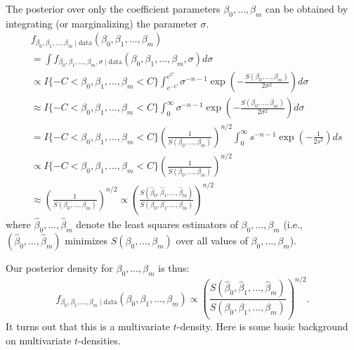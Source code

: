 \documentclass{scrartcl}
\begin{document}
The 
posterior over only the coefficient parameters $\beta_0, \dots, \beta_m$ can
be obtained by integrating (or marginalizing) the parameter $\sigma$. 
\begin{align*}
 & f_{\beta_0, \beta_1, \dots, \beta_m \mid \text{data}} (\beta_0, \beta_1, \dots,
   \beta_m) \\  &= \int 
                                                              f_{\beta_0, 
                                                              \beta_1,
                  \dots, \beta_m,
                                                              \sigma
                                                              \mid
                                                              \text{data}}(\beta_0,
                                                              \beta_1,
                  \dots, \beta_m,
                                                              \sigma)
                                                              d\sigma
  \\
  &\propto I\{-C < \beta_0, \beta_1, \dots, \beta_m < C\}
    \int_{e^{-C}}^{e^C} \sigma^{-n-1} \exp 
                                        \left(-\frac{S(\beta_0, \dots,
    \beta_m)}{2 \sigma^2} \right) d\sigma \\
&\approx 
    I\{-C < \beta_0, \beta_1, \dots, \beta_m < C\} \int_{0}^{\infty} \sigma^{-n-1}
    \exp 
                                        \left(-\frac{S(\beta_0,\dots, \beta_m)}{2 \sigma^2}                               
  \right)  d\sigma \\
&=    I\{-C < \beta_0, \beta_1, \dots, \beta_m < C\}
  \left(\frac{1}{S(\beta_0, \dots, \beta_m)}\right)^{n/2} \int_{0}^{\infty} s^{-n-1} \exp
  \left(-\frac{1}{2s^2} \right) ds \\
&\propto   I\{-C < \beta_0, \beta_1, \dots, \beta_m < C\}
  \left(\frac{1}{S(\beta_0, \dots, \beta_m)}\right)^{n/2} \\
 &\approx   \left(\frac{1}{S(\beta_0, \dots, \beta_m)}\right)^{n/2} \propto 
  \left(\frac{S(\hat{\beta}_0, \hat{\beta}_1, \dots,
      \hat{\beta}_m)}{S(\beta_0, \beta_1, \dots, \beta_m)} 
  \right)^{n/2}
\end{align*}
where $\hat{\beta}_0, \dots, \hat{\beta}_m$ denote the least squares
estimators of $\beta_0, \dots, \beta_m$ (i.e., $(\hat{\beta}_0, \dots,
\hat{\beta}_m)$ minimizes $S(\beta_0, \dots, \beta_m)$ over all values
of $\beta_0, \dots, \beta_m$). 

Our posterior density for $\beta_0, \dots, \beta_m$ is thus:  
\begin{equation}\label{bayespost_lm}
   f_{\beta_0, \beta_1, \dots, \beta_m \mid \text{data}} (\beta_0, \beta_1, \dots,
   \beta_m) \propto \left(\frac{S(\hat{\beta}_0, \hat{\beta}_1, \dots,
      \hat{\beta}_m)}{S(\beta_0, \beta_1, \dots, \beta_m)} 
  \right)^{n/2}. 
\end{equation}
It turns out that this is a multivariate $t$-density. Here is some
basic background on multivariate $t$-densities.
\end{document}
